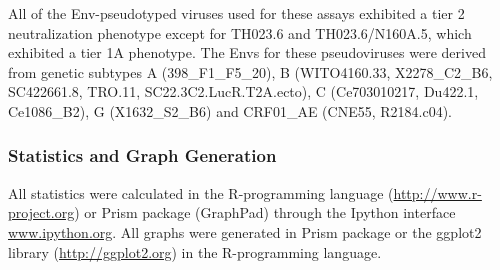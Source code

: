 All of the Env-pseudotyped viruses used for these assays exhibited a tier 2 neutralization phenotype except for TH023.6 and TH023.6/N160A.5, which exhibited a tier 1A phenotype. The Envs for these pseudoviruses were derived from genetic subtypes A (398\_F1\_F5\_20), B (WITO4160.33, X2278\_C2\_B6, SC422661.8, TRO.11, SC22.3C2.LucR.T2A.ecto), C (Ce703010217, Du422.1, Ce1086\_B2), G (X1632\_S2\_B6) and CRF01\_AE (CNE55, R2184.c04).

\subsubsection{Statistics and Graph Generation}
All statistics were calculated in the R-programming language (\url{http://www.r-project.org}) or Prism package (GraphPad) through the Ipython interface \url{www.ipython.org}. All graphs were generated in Prism package or the ggplot2 library (\url{http://ggplot2.org}) in the R-programming language.
\clearpage